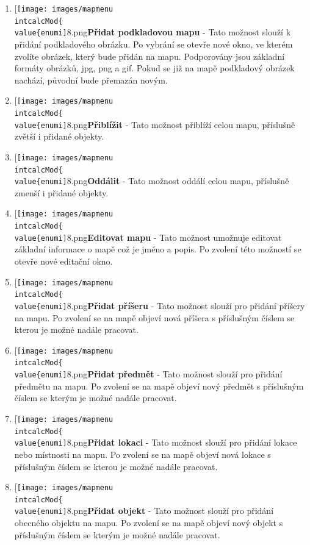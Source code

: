 \documentclass[12pt,a4paper,oneside]{article}
\newcommand*{\Mapmenu}{%
   \item[{\texttt{[image: images/mapmenu\\intcalcMod\{\\value\{enumi]}}{8}.png}}]\stepcounter{enumi}%
\begin{document}
	\begin{enumerate}[leftmargin=1cm]
   \Mapmenu \textbf{Přidat podkladovou mapu} - Tato možnost slouží k přidání podkladového obrázku. Po vybrání se otevře nové okno, ve kterém zvolíte obrázek, který bude přidán na mapu. Podporovány jsou základní formáty obrázků, jpg, png a gif. Pokud se již na mapě podkladový obrázek nachází, původní bude přemazán novým.
   \Mapmenu \textbf{Přiblížit} - Tato možnost přiblíží celou mapu, příslušně zvětší i přidané objekty.
   
   \Mapmenu \textbf{Oddálit} - Tato možnost oddálí celou mapu, příslušně zmenší i přidané objekty.
   
   \Mapmenu \textbf{Editovat mapu} - Tato možnost umožnuje editovat základní informace o mapě což je jméno a popis. Po zvolení této možností se otevře nové editační okno.
   
   \Mapmenu \textbf{Přidat příšeru} - Tato možnost slouží pro přidání příšery na mapu. Po zvolení se na mapě objeví nová příšera s příslušným číslem se kterou je možné nadále pracovat.
   
   \Mapmenu \textbf{Přidat předmět} - Tato možnost slouží pro přidání předmětu na mapu. Po zvolení se na mapě objeví nový předmět s příslušným číslem se kterým je možné nadále pracovat.
   
   \Mapmenu \textbf{Přidat lokaci} - Tato možnost slouží pro přidání lokace nebo místnosti na mapu. Po zvolení se na mapě objeví nová lokace s příslušným číslem se kterou je možné nadále pracovat.
   
   \Mapmenu \textbf{Přidat objekt} - Tato možnost slouží pro přidání obecného objektu na mapu. Po zvolení se na mapě objeví nový objekt s příslušným číslem se kterým je možné nadále pracovat.

\end{enumerate}
	
	\newpage
\end{document}
